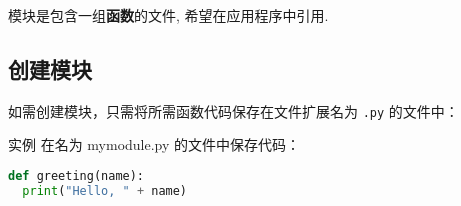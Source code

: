 
模块是包含一组\textbf{函数}的文件, 希望在应用程序中引用.
\subsection{创建模块}
如需创建模块，只需将所需函数代码保存在文件扩展名为 \verb|.py| 的文件中：
\begin{example}{}
实例
在名为 mymodule.py 的文件中保存代码：
\begin{lstlisting}[language=python]
def greeting(name):
  print("Hello, " + name)
\end{lstlisting}

\end{example}